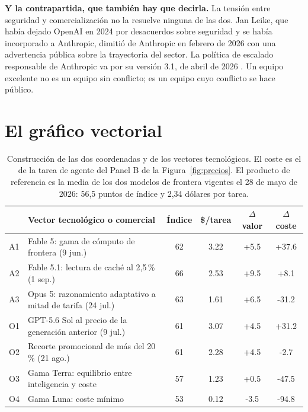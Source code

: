 \documentclass[11pt,letterpaper]{article}
\begin{document}
\textbf{Y la contrapartida, que también hay que decirla.} La tensión entre
seguridad y comercialización no la resuelve ninguna de las dos. Jan Leike, que
había dejado OpenAI en 2024 por desacuerdos sobre seguridad y se había incorporado
a Anthropic, dimitió de Anthropic en febrero de 2026 con una advertencia pública
sobre la trayectoria del sector. La política de escalado responsable de Anthropic
va por su versión 3.1, de abril de 2026 \parencite{anthropic2026rsp}. Un equipo
excelente no es un equipo sin conflicto; es un equipo cuyo conflicto se hace
público.

\section{El gráfico vectorial}
\label{sec:vectorial}

\begin{table}[tbp]
  \centering
  \small
  \setlength{\tabcolsep}{4pt}
  \caption{Construcción de las dos coordenadas y de los vectores tecnológicos.
  El coste es el de la tarea de agente del Panel B de la
  Figura~\ref{fig:precios}. El producto de referencia es la media de los dos
  modelos de frontera vigentes el 28 de mayo de 2026: 56,5 puntos de índice y
  2,34 dólares por tarea.}
  \label{tab:vectores}
  \begin{tabularx}{\textwidth}{@{}l >{\raggedright\arraybackslash}X
    S[table-format=2.0] S[table-format=1.2]
    S[table-format=+2.1] S[table-format=+3.1]@{}}
    \toprule
    & \textbf{Vector tecnológico o comercial} & {\textbf{Índice}}
      & {\textbf{\$/tarea}} & {\textbf{$\Delta$ valor}}
      & {\textbf{$\Delta$ coste}} \\
    \midrule
    A1 & Fable 5: gama de cómputo de frontera (9 jun.) & 62 & 3.22
       & +5.5 & +37.6 \\
    A2 & Fable 5.1: lectura de caché al 2,5\,\% (1 sep.) & 66 & 2.53
       & +9.5 & +8.1 \\
    A3 & Opus 5: razonamiento adaptativo a mitad de tarifa (24 jul.)
       & 63 & 1.61 & +6.5 & -31.2 \\
    \addlinespace
    O1 & GPT-5.6 Sol al precio de la generación anterior (9 jul.)
       & 61 & 3.07 & +4.5 & +31.2 \\
    O2 & Recorte promocional de más del 20\,\% (21 ago.) & 61 & 2.28
       & +4.5 & -2.7 \\
    O3 & Gama Terra: equilibrio entre inteligencia y coste & 57 & 1.23
       & +0.5 & -47.5 \\
    O4 & Gama Luna: coste mínimo & 53 & 0.12 & -3.5 & -94.8 \\
    \bottomrule
  \end{tabularx}
\end{table}
\end{document}
